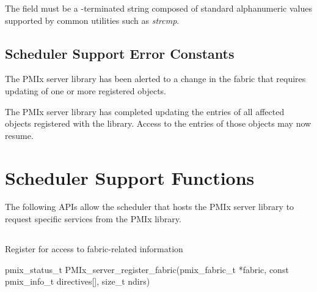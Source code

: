 The  field must be a -terminated string composed of standard alphanumeric values supported by common utilities such as \textit{strcmp}.


\subsection{Scheduler Support Error Constants}
\label{api:sched:errors}

\begin{constantdesc}

%
The \ac{PMIx} server library has been alerted to a change in the fabric that requires updating of one or more registered  objects.

%
The \ac{PMIx} server library has completed updating the entries of all affected  objects registered with the library. Access to the entries of those objects may now resume.

\end{constantdesc}


\section{Scheduler Support Functions}

The following \acp{API} allow the scheduler that hosts the \ac{PMIx} server library to request specific services from the \ac{PMIx} library.

\subsection{}

\summary

Register for access to fabric-related information

\format

\cspecificstart
\begin{codepar}
pmix_status_t
PMIx_server_register_fabric(pmix_fabric_t *fabric,
                            const pmix_info_t directives[],
                            size_t ndirs)
\end{codepar}
\cspecificend

\begin{arglist}
\end{arglist}

